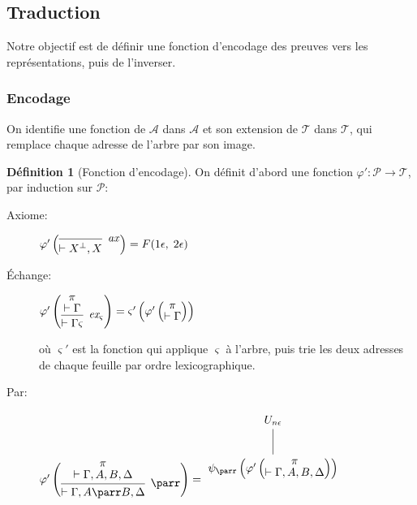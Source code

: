 \documentclass[11pt,a4paper]{article}
\theoremstyle{plain}
\theoremstyle{definition}
\newtheorem{definition}{Définition}
\theoremstyle{remark}
\newcommand*{\orth}{^\perp}
\newcommand*{\namedproofv}[2]{\hypo{#1}\infer[no rule]{1}{\vdash #2}}
\newcommand*{\axv}[1]{\infer{0}[\ensuremath{\mathit{ax}}]{\vdash #1}}
\newcommand*{\parrv}[1]{\infer{1}[\ensuremath{\parr}]{\vdash #1}}
\newcommand*{\permv}[2]{\infer{1}[\ensuremath{\textit{ex}_{#1}}]{\vdash #2}}
\newcommand*{\permapp}[2]{#2 #1}
\newcommand*{\someperm}{\varsigma}
\newcommand*{\sequent}{\Gamma}
\newcommand*{\sequentbis}{\Delta}
\newcommand*{\proofs}{\ensuremath{\mathcal{P}}}
\newcommand*{\addresses}{\ensuremath{\mathcal{A}}}
\newcommand*{\trees}{\ensuremath{\mathcal{T}}}
\newcommand*{\encode}{\ensuremath{\varphi}}
\begin{document}
\subsection{Traduction}
Notre objectif est de définir une fonction d'encodage des preuves vers les représentations, puis de l'inverser.

\subsubsection{Encodage}

On identifie une fonction de $\addresses$ dans $\addresses$ et son extension de $\trees$ dans $\trees$, qui remplace chaque adresse de l'arbre par son image.

\begin{definition}[Fonction d'encodage]
  On définit d'abord une fonction $\encode' : \proofs \rightarrow \trees$, par induction sur $\proofs$:
    \begin{description}
    \item[Axiome:]
    $\encode' \left(
    \begin{prooftree}
        \axv{{X}\orth, X}
    \end{prooftree}
    \right) = F(1 \epsilon, \; 2 \epsilon)$

    \item[Échange:]
    $\encode' \left(
    \begin{prooftree}
      \namedproofv{\pi}{\sequent}
      \permv{\someperm}{\permapp{\someperm}{\sequent}}
    \end{prooftree}
    \right) = \someperm' \left( \encode ' \left(
           \begin{prooftree}
             \namedproofv{\pi}{\sequent}
           \end{prooftree} \right) \right)$
           
    où $\someperm'$ est la fonction qui applique $\someperm$ à l'arbre, puis trie les deux adresses de chaque feuille par ordre lexicographique.

    \item[Par:]
    $\encode' \left(
    \begin{prooftree}
      \namedproofv{\pi}{\sequent, A, B, \sequentbis}
      \parrv{\sequent, A \parr B, \sequentbis}
    \end{prooftree}
    \right) = \begin{tikzpicture}%
    [level distance=1.5cm,
    level 2/.style={sibling distance=3.5cm}]
    \node {$U_{n \epsilon}$}
        child {node {$\psi_\parr \left( \encode' \left(
           \begin{prooftree}
             \namedproofv{\pi}{\sequent, A, B, \sequentbis}
           \end{prooftree} \right) \right)$}
    };
    \end{tikzpicture}$
    

\end{description}
\end{definition}
\end{document}
